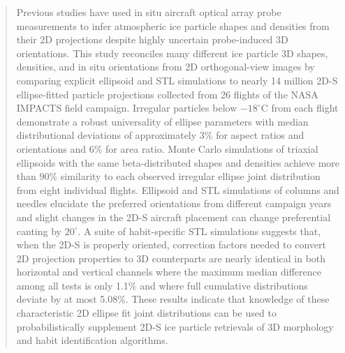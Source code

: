 \documentclass[amt, manuscript]{copernicus}
\begin{document}

\maketitle





\begin{abstract}
Previous studies have used in situ aircraft optical array probe measurements to infer atmospheric ice particle shapes and densities from their 2D projections despite highly uncertain probe-induced 3D orientations. This study reconciles many different ice particle 3D shapes, densities, and in situ orientations from 2D orthogonal-view images by comparing explicit ellipsoid and STL simulations to nearly 14 million 2D-S ellipse-fitted particle projections collected from 26 flights of the NASA IMPACTS field campaign. Irregular particles below $-18^{\circ}$C from each flight demonstrate a robust universality of ellipse parameters with median distributional deviations of approximately 3\% for aspect ratios and orientations and 6\% for area ratio. Monte Carlo simulations of triaxial ellipsoids with the same beta-distributed shapes and densities achieve more than $90\%$ similarity to each observed irregular ellipse joint distribution from eight individual flights. Ellipsoid and STL simulations of columns and needles elucidate the preferred orientations from different campaign years and slight changes in the 2D-S aircraft placement can change preferential canting by $20^{\circ}$. A suite of habit-specific STL simulations suggests that, when the 2D-S is properly oriented, correction factors needed to convert 2D projection properties to 3D counterparts are nearly identical in both horizontal and vertical channels where the maximum median difference among all tests is only 1.1\% and where full cumulative distributions deviate by at most 5.08\%. These results indicate that knowledge of these characteristic 2D ellipse fit joint distributions can be used to probabilistically supplement 2D-S ice particle retrievals of 3D morphology and habit identification algorithms.
\end{abstract}
\end{document}
